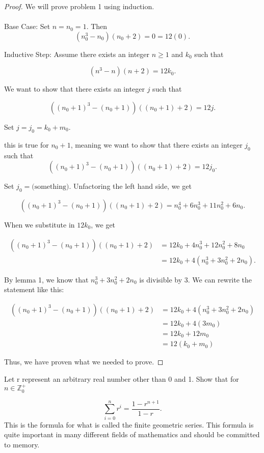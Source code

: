 \documentclass[12pt]{article}
\newenvironment{problem}[2][Problem]{\begin{trivlist}
\item[\hskip \labelsep {\bfseries #1}\hskip \labelsep {\bfseries #2.}]}{\end{trivlist}}
\begin{document}
\begin{proof} We will prove problem 1 using induction. \\ \\
    Base Case: Set $n = n_0 = 1$. Then
    $$(n_0^3 - n_0)(n_0 + 2) = 0 = 12(0).$$

    \noindent Inductive Step: Assume there exists an integer $n \geq 1$ and $k_0$ such that

    $$(n^3 - n)(n + 2) = 12k_0.$$

    We want to show that there exists an integer $j$ such that

    $$((n_0+1)^3 - (n_0+1))((n_0+1) + 2) = 12j.$$

    Set $j = j_0 = k_0 + m_0$.
    
    this is true for $n_0 + 1$, meaning we want to show that there exists an integer $j_0$ such that
    $$((n_0+1)^3 - (n_0+1))((n_0+1) + 2) = 12j_0.$$

    Set $j_0 = \text{(something)}.$ Unfactoring the left hand side, we get 

    $$((n_0+1)^3 - (n_0+1))((n_0+1) + 2) = n_0^4 + 6n_0^3 + 11n_0^2 + 6n_0.$$

    When we substitute in $12k_0$, we get

    \begin{align*}
        ((n_0+1)^3 - (n_0+1))((n_0+1) + 2) & = 12k_0 + 4n_0^3 + 12n_0^2 + 8n_0 \\
        & = 12k_0 + 4(n_0^3 + 3n_0^2 + 2n_0).
    \end{align*}

    By lemma 1, we know that $n_0^3 + 3n_0^2 + 2n_0$ is divisible by 3. We can rewrite the statement like this:

    \begin{align*}
        ((n_0+1)^3 - (n_0+1))((n_0+1) + 2) & = 12k_0 + 4(n_0^3 + 3n_0^2 + 2n_0) \\
        & = 12k_0 + 4(3m_0) \\
        & = 12k_0 + 12m_0 \\
        & = 12(k_0 + m_0)
    \end{align*}


    Thus, we have proven what we needed to prove.


\end{proof}





\newpage
\begin{problem}{2}
    Let r represent an arbitrary real number other than 0 and 1. Show that for $n \in \mathbb{Z}_0^+$

    $$\sum_{i=0}^{n} r^i = \frac{1 - r^{n+1}}{1 - r}.$$
    This is the formula for what is called the finite geometric series. This formula is quite important in many different fields of mathematics and should be committed to memory.

\end{problem}
\end{document}

